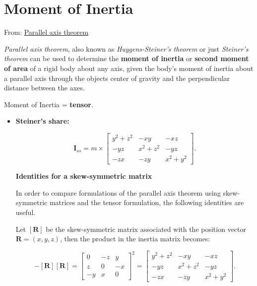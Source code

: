 \documentclass[10pt,b5paper,titlepage]{book}
\begin{document}
\section{Moment of Inertia}

From: \href{https://en.wikipedia.org/wiki/Parallel_axis_theorem}{Parallel axis theorem}

\textit{Parallel axis theorem}, also known as \textit{Huygens-Steiner's theorem}
or just \textit{Steiner's theorem} can be used to determine the \textbf{moment of inertia}
or \textbf{second moment of area} of a rigid body about any axis, given the body's
moment of inertia about a parallel axis through the objects center of gravity
and the perpendicular distance between the axes.

Moment of Inertia = \textbf{tensor}.

\begin{itemize}
    \item \textbf{Steiner's share:}

        \begin{equation}
            \mathbf{I}_{ss} = m \times \begin{bmatrix}
                y^{2} + z^{2} & -xy & -xz \\
                -yz & x^{2} + z^{2} & -yz \\
                -zx & -zy & x^{2} + y^{2}
            \end{bmatrix}
        .\end{equation}

        \textbf{Identities for a skew-symmetric matrix}

        In order to compare formulations of the parallel axis theorem using
        skew-symmetric matrices and the tensor formulation, the following
        identities are useful.

        Let $[\mathbf{R}]$ be the skew-symmetric matrix associated with the
        position vector $\mathbf{R} = (x, y, z)$, then the product in
        the inertia matrix becomes:

        \begin{equation}
            -[\mathbf{R}][\mathbf{R}] = \begin{bmatrix}
                0 & -z & y \\
                z & 0 & -x \\
                -y & x & 0
            \end{bmatrix}^{2}
            = \begin{bmatrix}
                y^{2} + z^{2} & -xy & -xz \\
                -yz & x^{2} + z^{2} & -yz \\
                -zx & -zy & x^{2} + y^{2}
            \end{bmatrix}
        .\end{equation}


\end{itemize}
\end{document}
